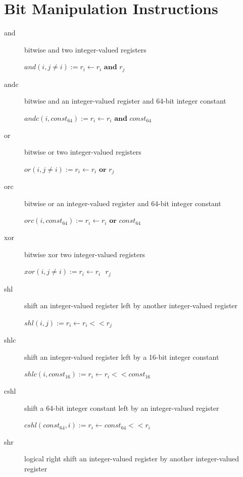 \documentclass[english,a4paper]{report}
\begin{document}
\section{Bit Manipulation Instructions}
\begin{description}
	\item[and] bitwise and two integer-valued registers
	
	$and(i, j\neq i) := r _{i} \longleftarrow  r _{i}  \textbf{ and } 
	r _{j} $ \\
	\item[andc] bitwise and an integer-valued register and 64-bit 
	integer
	constant
	
	$andc(i, const _{64}) :=  r _{i} \longleftarrow  r _{i} \textbf{ 
	and } const _{64} $ \\
	\item[or] bitwise or two integer-valued registers
	
	$or(i, j \neq i) := r _{i} \longleftarrow  r _{i} \textbf{ or } r 
	_{j} $  \\
	\item[orc] bitwise or an integer-valued register and 64-bit 
	integer
	constant
	
	$orc(i, const _{64}) :=  r _{i} \longleftarrow  r _{i} \textbf{ 
	or } const _{64} $ \\
	\item[xor] bitwise xor two integer-valued registers
	
	$xor(i, j \neq i) := r _{i} \longleftarrow  r _{i} \textbf{ \^{} 
	} r _{j} $ \\
	\item[shl] shift an integer-valued register left by another
	integer-valued register
	
	$shl(i, j) := r _{i} \longleftarrow  r _{i} << r _{j} $ \\
	\item[shlc] shift an integer-valued register left by a 16-bit 
	integer
	constant
	
	$shlc(i, const _{16}) :=  r _{i} \longleftarrow  r _{i} << const 
	_{16} $ \\
	\item[cshl] shift a 64-bit integer constant left by an 	integer-valued register
	
	$cshl(const _{64}, i):=  r _{i} \longleftarrow  const _{64} << r 
	_{i}  $ \\
	\item[shr] logical right shift an integer-valued register by 
	another integer-valued register
	

\end{description}
\end{document}
